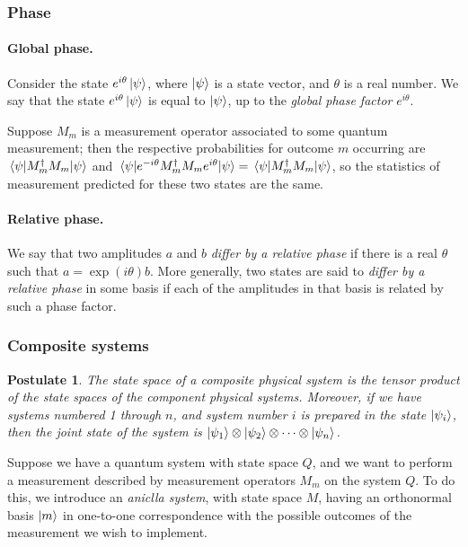 \documentclass{article}
\numberwithin{theorem}{section}
\numberwithin{corollary}{section}
\newtheorem{postulate}{Postulate}
\numberwithin{postulate}{section}
\begin{document}
\subsubsection{Phase}

\paragraph{Global phase.} Consider the state $e^{i\theta}\ket{\psi}$, where
$\ket{\psi}$ is a state vector, and $\theta$ is a real number. We say that the
state $e^{i\theta}\ket{\psi}$ is equal to $\ket{\psi}$, up to the \emph{global
phase factor} $e^{i\theta}$.

Suppose $M_m$ is a measurement operator associated to some quantum measurement;
then the respective probabilities for outcome $m$ occurring are
$\ev{M_m^{\dagger}M_m}{\psi}$ and
$\ev{e^{-i\theta}M_m^{\dagger}M_me^{i\theta}}{\psi} =
\ev{M_m^{\dagger}M_m}{\psi}$, so the statistics of measurement predicted for
these two states are the same.

\paragraph{Relative phase.} We say that two amplitudes $a$ and $b$ \emph{differ
by a relative phase} if there is a real $\theta$ such that $a =
\exp(i\theta)b$. More generally, two states are said to \emph{differ by a
relative phase} in some basis if each of the amplitudes in that basis is
related by such a phase factor.

\subsubsection{Composite systems}

\begin{postulate}
  The state space of a composite physical system is the tensor product of the
  state spaces of the component physical systems. Moreover, if we have systems
  numbered 1 through $n$, and system number $i$ is prepared in the state
  $\ket{\psi_i}$, then the joint state of the system is $\ket{\psi_1} \otimes
  \ket{\psi_2} \otimes \cdots \otimes \ket{\psi_n}$.
\end{postulate}

Suppose we have a quantum system with state space $Q$, and we want to perform a
measurement described by measurement operators $M_m$ on the system $Q$. To do
this, we introduce an \emph{aniclla system}, with state space $M$, having an
orthonormal basis $\ket{m}$ in one-to-one correspondence with the possible
outcomes of the measurement we wish to implement.
\end{document}
